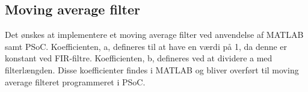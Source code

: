 \subsection{Moving average filter}
Det ønskes at implementere et moving average filter ved anvendelse af MATLAB samt PSoC. Koefficienten, a, defineres til at have en værdi på 1, da denne er konstant ved FIR-filtre. Koefficienten, b, defineres ved at dividere a med filterlængden. Disse koefficienter findes i MATLAB og bliver overført til moving average filteret programmeret i PSoC. 
